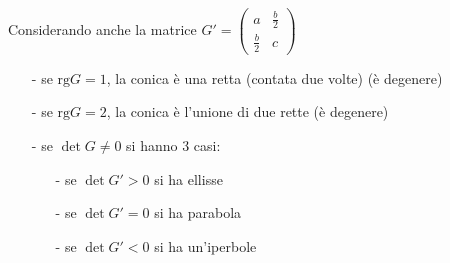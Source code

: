\documentclass[a4paper]{article}
\newcommand\rg{\text{rg}} 		%
\begin{document}
Considerando anche la matrice \(\displaystyle G' = \left( \begin{matrix} a & \frac{b}{2} \\ \frac{b}{2} & c \end{matrix} \right)\)
\begin{itemize}[topsep=3pt, itemsep=0pt]
	\item[-] se \(\rg G = 1\), la conica è una retta (contata due volte) (è degenere)
	\item[-] se \(\rg G = 2\), la conica è l'unione di due rette (è degenere)
	\item[-] se \(\det G \neq 0\) si hanno 3 casi:
	\begin{itemize}[topsep=3pt, itemsep=0pt]
		\item[-] se \(\det G' > 0\) si ha ellisse
		\item[-] se \(\det G' = 0\) si ha parabola
		\item[-] se \(\det G' < 0\) si ha un'iperbole
	\end{itemize}
\end{itemize}
\end{document}
